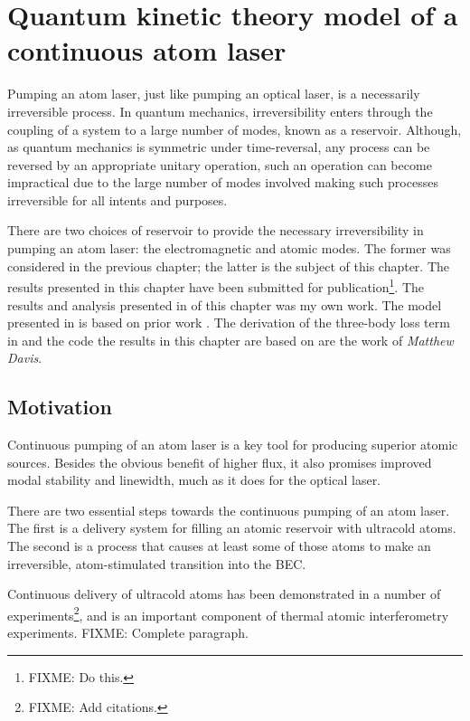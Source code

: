 \chapter{Quantum kinetic theory model of a continuous atom laser}
\label{KineticTheory}
\graphicspath{{Figures/KineticTheory/}{Figures/Common/}}

Pumping an atom laser, just like pumping an optical laser, is a necessarily irreversible process. In quantum mechanics, irreversibility enters through the coupling of a system to a large number of modes, known as a reservoir. Although, as quantum mechanics is symmetric under time-reversal, any process can be reversed by an appropriate unitary operation, such an operation can become impractical due to the large number of modes involved making such processes irreversible for all intents and purposes.

There are two choices of reservoir to provide the necessary irreversibility in pumping an atom laser: the electromagnetic and atomic modes. The former was considered in the previous chapter; the latter is the subject of this chapter. The results presented in this chapter have been submitted for publication\footnote{FIXME: Do this.}. The results and analysis presented in  of this chapter was my own work. The model presented in  is based on prior work \citep{Davis:2000vn,Bijlsma:2000}. The derivation of the three-body loss term in  and the code the results in this chapter are based on are the work of \emph{Matthew Davis}.

\section{Motivation}

Continuous pumping of an atom laser is a key tool for producing superior atomic sources. Besides the obvious benefit of higher flux, it also promises improved modal stability and linewidth, much as it does for the optical laser.

There are two essential steps towards the continuous pumping of an atom laser. The first is a delivery system for filling an atomic reservoir with ultracold atoms. The second is a process that causes at least some of those atoms to make an irreversible, atom-stimulated transition into the BEC.

Continuous delivery of ultracold atoms has been demonstrated in a number of experiments\footnote{FIXME: Add citations.}, and is an important component of thermal atomic interferometry experiments. FIXME: Complete paragraph.

